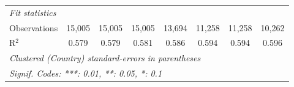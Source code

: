 \begin{tabular}{lccccccc}
   \midrule \emph{Fit statistics}\\
   Observations                                                             & 15,005       & 15,005        & 15,005         & 13,694         & 11,258        & 11,258        & 10,262\\  
   R$^2$                                                                    & 0.579        & 0.579         & 0.581          & 0.586          & 0.594         & 0.594         & 0.596\\  
   \midrule
   \multicolumn{8}{l}{\emph{Clustered (Country) standard-errors in parentheses}}\\
   \multicolumn{8}{l}{\emph{Signif. Codes: ***: 0.01, **: 0.05, *: 0.1}}\\
\end{tabular}
\par\endgroup


